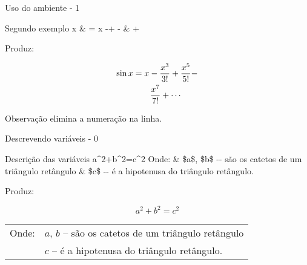 \begin{frame}{Uso do ambiente  - 1}
	\begin{Codigo}{Segundo exemplo}
		 x \& =  x -+
		-  \LCmd{\bs}\n
		\& +
	\end{Codigo}

    \pause
	Produz:

	\begin{Resultado}{}
		\begin{align}
			\sin x & =  x -\frac{x^3}{3!}+
			\frac{x^5}{5!}- \notag \\
			&\qquad  \frac{x^7}{7!}+\cdots
		\end{align}
	\end{Resultado}
	
	\pause
	\begin{Observacao}{Observação}
		\texttt{\string\notag} elimina a numeração na linha.
	\end{Observacao}
\end{frame}

\begin{frame}{Descrevendo variáveis - 0}
	\begin{Codigo}{Descrição das variáveis}
		\LCmd{[}a\string^2+b\string^2=c\string^2\LCmd{]}
		\nn
		\n
			Onde: \& \$a\$, \$b\$ -{}- são os catetos de um triângulo retângulo\n
			\& \$c\$ -{}- é a hipotenusa do triângulo retângulo.
	\end{Codigo}

    \pause
	Produz:

	\begin{Resultado}{}
		\[a^2+b^2=c^2\]

		\begin{tabular}{lp{}}
			Onde: & $a$, $b$ -- são os catetos de um triângulo retângulo\tabularnewline
			& $c$ -- é a hipotenusa do triângulo retângulo.
		\end{tabular}
	\end{Resultado}
\end{frame}

